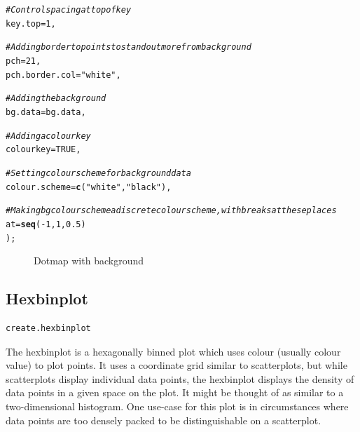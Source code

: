 \documentclass[letterpaper]{article}\usepackage[]{graphicx}\usepackage[]{color}
\makeatletter
\newcommand{\hlnum}[1]{\textcolor[rgb]{0.686,0.059,0.569}{#1}}%
\newcommand{\hlstr}[1]{\textcolor[rgb]{0.192,0.494,0.8}{#1}}%
\newcommand{\hlcom}[1]{\textcolor[rgb]{0.678,0.584,0.686}{\textit{#1}}}%
\newcommand{\hlopt}[1]{\textcolor[rgb]{0,0,0}{#1}}%
\newcommand{\hlstd}[1]{\textcolor[rgb]{0.345,0.345,0.345}{#1}}%
\newcommand{\hlkwc}[1]{\textcolor[rgb]{0.333,0.667,0.333}{#1}}%
\newcommand{\hlkwd}[1]{\textcolor[rgb]{0.737,0.353,0.396}{\textbf{#1}}}%
\newenvironment{kframe}{%
 \def\at@end@of@kframe{}%
 \ifinner\ifhmode%
  \def\at@end@of@kframe{\end{minipage}}%
  \begin{minipage}{\columnwidth}%
 \fi\fi%
 \def\FrameCommand##1{\hskip\@totalleftmargin \hskip-\fboxsep
 \colorbox{shadecolor}{##1}\hskip-\fboxsep
     \hskip-\linewidth \hskip-\@totalleftmargin \hskip\columnwidth}%
 \MakeFramed {\advance\hsize-\width
   \@totalleftmargin\z@ \linewidth\hsize
   \@setminipage}}%
 {\par\unskip\endMakeFramed%
 \at@end@of@kframe}
\newenvironment{knitrout}{}{} %
\makeatother
\begin{document}
\begin{knitrout}
\begin{kframe}
\begin{alltt}
    \hlcom{# Control spacing at top of key}
    \hlkwc{key.top} \hlstd{=} \hlnum{1}\hlstd{,}

    \hlcom{# Adding border to points to stand out more from background}
    \hlkwc{pch} \hlstd{=} \hlnum{21}\hlstd{,}
    \hlkwc{pch.border.col} \hlstd{=} \hlstr{"white"}\hlstd{,}

    \hlcom{# Adding the background}
    \hlkwc{bg.data} \hlstd{= bg.data,}

    \hlcom{# Adding a colourkey}
    \hlkwc{colourkey} \hlstd{=} \hlnum{TRUE}\hlstd{,}

    \hlcom{# Setting colour scheme for background data}
    \hlkwc{colour.scheme} \hlstd{=} \hlkwd{c}\hlstd{(}\hlstr{"white"}\hlstd{,} \hlstr{"black"}\hlstd{),}

    \hlcom{# Making bg colour scheme a discrete colour scheme, with breaks at these places}
    \hlkwc{at} \hlstd{=} \hlkwd{seq}\hlstd{(}\hlopt{-}\hlnum{1}\hlstd{,} \hlnum{1}\hlstd{,} \hlnum{0.5}\hlstd{)}
    \hlstd{);}
\end{alltt}
\end{kframe}\begin{figure}[]


{\centering {} 

}

\caption[Dotmap with background]{Dotmap with background\label{fig:dotmap3}}
\end{figure}


\end{knitrout}

\subsection{Hexbinplot}
\begin{verbatim}
create.hexbinplot
\end{verbatim}

The hexbinplot is a hexagonally binned plot which uses colour (usually colour value) to plot points. It uses a coordinate grid similar to scatterplots, but while scatterplots display individual data points, the hexbinplot displays the density of data points in a given space on the plot. It might be thought of as similar to a two-dimensional histogram. One use-case for this plot is in circumstances where data points are too densely packed to be distinguishable on a scatterplot.
\end{document}

